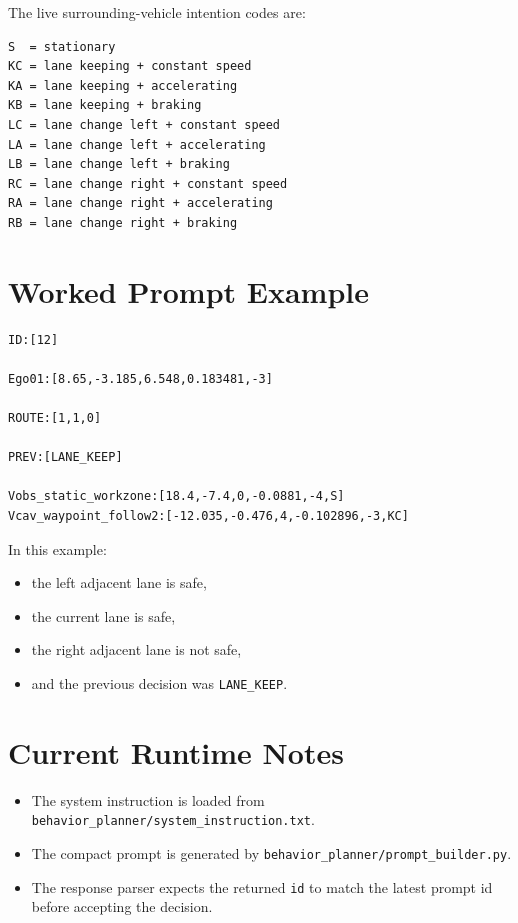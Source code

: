 \documentclass[11pt]{article}
\begin{document}
The live surrounding-vehicle intention codes are:

\begin{lstlisting}[style=codestyle]
S  = stationary
KC = lane keeping + constant speed
KA = lane keeping + accelerating
KB = lane keeping + braking
LC = lane change left + constant speed
LA = lane change left + accelerating
LB = lane change left + braking
RC = lane change right + constant speed
RA = lane change right + accelerating
RB = lane change right + braking
\end{lstlisting}

\section{Worked Prompt Example}

\begin{lstlisting}[style=codestyle]
ID:[12]

Ego01:[8.65,-3.185,6.548,0.183481,-3]

ROUTE:[1,1,0]

PREV:[LANE_KEEP]

Vobs_static_workzone:[18.4,-7.4,0,-0.0881,-4,S]
Vcav_waypoint_follow2:[-12.035,-0.476,4,-0.102896,-3,KC]
\end{lstlisting}

In this example:

\begin{itemize}
    \item the left adjacent lane is safe,
    \item the current lane is safe,
    \item the right adjacent lane is not safe,
    \item and the previous decision was \texttt{LANE\_KEEP}.
\end{itemize}

\section{Current Runtime Notes}

\begin{itemize}
    \item The system instruction is loaded from
    \texttt{behavior\_planner/system\_instruction.txt}.
    \item The compact prompt is generated by
    \texttt{behavior\_planner/prompt\_builder.py}.
    \item The response parser expects the returned \texttt{id} to match the
    latest prompt id before accepting the decision.
\end{itemize}
\end{document}

